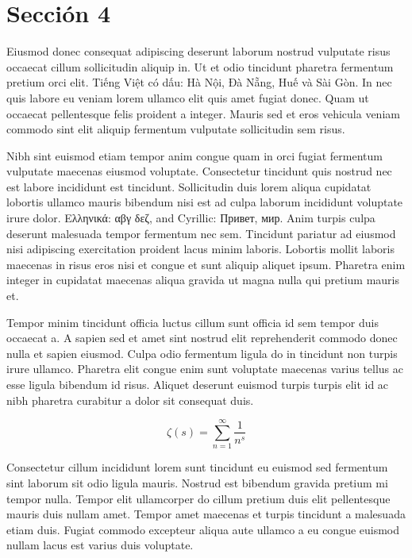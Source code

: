 \documentclass[11pt,a4paper]{article}
\begin{document}
\section{Sección 4}
Eiusmod donec consequat adipiscing deserunt laborum nostrud vulputate
risus occaecat cillum sollicitudin aliquip in. Ut et odio tincidunt
pharetra fermentum pretium orci elit. Tiếng Việt có dấu: Hà Nội, Đà
Nẵng, Huế và Sài Gòn. In nec quis labore eu veniam lorem ullamco elit
quis amet fugiat donec. Quam ut occaecat pellentesque felis proident a
integer. Mauris sed et eros vehicula veniam commodo sint elit aliquip
fermentum vulputate sollicitudin sem risus.

Nibh sint euismod etiam tempor anim congue quam in orci fugiat fermentum
vulputate maecenas eiusmod voluptate. Consectetur tincidunt quis nostrud
nec est labore incididunt est tincidunt. Sollicitudin duis lorem aliqua
cupidatat lobortis ullamco mauris bibendum nisi est ad culpa laborum
incididunt voluptate irure dolor. Ελληνικά: αβγ δεζ, and Cyrillic:
Привет, мир. Anim turpis culpa deserunt malesuada tempor fermentum nec
sem. Tincidunt pariatur ad eiusmod nisi adipiscing exercitation proident
lacus minim laboris. Lobortis mollit laboris maecenas in risus eros nisi
et congue et sunt aliquip aliquet ipsum. Pharetra enim integer in
cupidatat maecenas aliqua gravida ut magna nulla qui pretium mauris et.

Tempor minim tincidunt officia luctus cillum sunt officia id sem tempor
duis occaecat a. A sapien sed et amet sint nostrud elit reprehenderit
commodo donec nulla et sapien eiusmod. Culpa odio fermentum ligula do in
tincidunt non turpis irure ullamco. Pharetra elit congue enim sunt
voluptate maecenas varius tellus ac esse ligula bibendum id risus.
Aliquet deserunt euismod turpis turpis elit id ac nibh pharetra
curabitur a dolor sit consequat duis.

\begin{equation}
  \zeta(s) = \sum_{n=1}^{\infty} \frac{1}{n^s}
\end{equation}

Consectetur cillum incididunt lorem sunt tincidunt eu euismod sed
fermentum sint laborum sit odio ligula mauris. Nostrud est bibendum
gravida pretium mi tempor nulla. Tempor elit ullamcorper do cillum
pretium duis elit pellentesque mauris duis nullam amet. Tempor amet
maecenas et turpis tincidunt a malesuada etiam duis. Fugiat commodo
excepteur aliqua aute ullamco a eu congue euismod nullam lacus est
varius duis voluptate.
\end{document}
